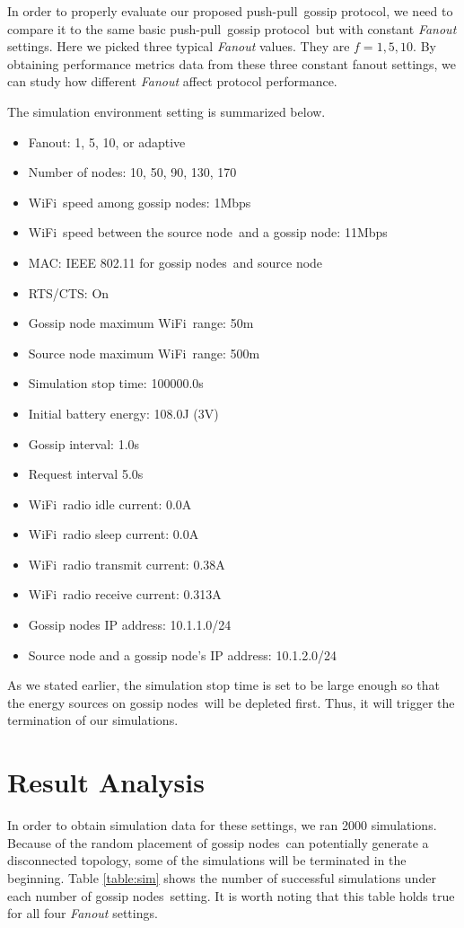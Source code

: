 \documentclass[onehalf,11pt]{beavtex}
\newcommand{\gp}{gossip protocol}
\newcommand{\pp}{push-pull}
\newcommand{\gn}{gossip node}
\newcommand{\gns}{gossip nodes}
\newcommand{\wf}{WiFi}
\newcommand{\sn}{source node}
\begin{document}
In order to properly evaluate our proposed \pp ~\gp, we need to compare it to the same basic \pp ~\gp ~but with constant \emph{Fanout} settings. Here we picked three typical \emph{Fanout} values. They are $f=1, 5, 10$. By obtaining performance metrics data from these three constant fanout settings, we can study how different \emph{Fanout} affect protocol performance. 

The simulation environment setting is summarized below.

\begin{itemize}
	\item Fanout: 1, 5, 10, or adaptive
	\item Number of nodes: 10, 50, 90, 130, 170
	\item \wf ~speed among \gns: 1Mbps
	\item \wf ~speed between the \sn ~and a \gn: 11Mbps
	\item MAC: IEEE 802.11 for \gns ~and \sn
	\item RTS/CTS: On
	\item Gossip node maximum \wf ~range: 50m
	\item Source node maximum \wf ~range: 500m
	\item Simulation stop time: 100000.0s
	\item Initial battery energy: 108.0J  (3V)
	\item Gossip interval: 1.0s
	\item Request interval 5.0s
	\item \wf ~radio idle current: 0.0A
	\item \wf ~radio sleep current: 0.0A
	\item \wf ~radio transmit current: 0.38A
	\item \wf ~radio receive current: 0.313A
	\item Gossip nodes IP address: 10.1.1.0/24
	\item Source node and a \gn's IP address: 10.1.2.0/24	
\end{itemize}

As we stated earlier, the simulation stop time is set to be large enough so that the energy sources on \gns ~will be depleted first. Thus, it will trigger the termination of our simulations. 

\section{Result Analysis}

In order to obtain simulation data for these settings, we ran 2000 simulations. Because of the random placement of \gns ~can potentially generate a disconnected topology, some of the simulations will be terminated in the beginning. Table \ref{table:sim} shows the number of successful simulations under each number of \gns ~setting. It is worth noting that this table holds true for all four \emph{Fanout} settings.
\end{document}
